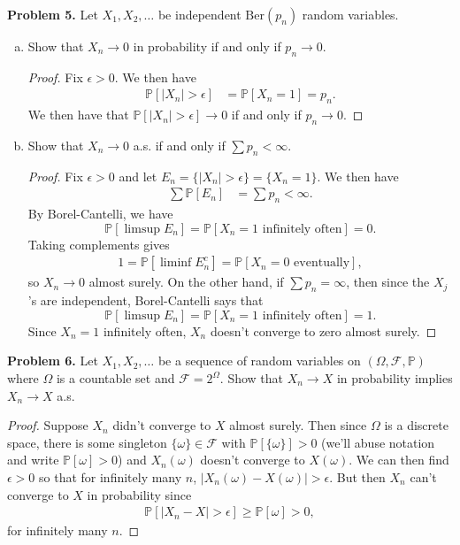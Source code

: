 \documentclass[11pt,letterpaper]{report}
\newcommand{\mcal}[1]{\mathcal{#1}}
\newcommand{\Prob}{\mathbb{P}}
\newcommand{\Ber}{\text{Ber}}
\begin{document}
\noindent\textbf{Problem 5. }
Let $X_1, X_2, \ldots$ be independent $\Ber(p_n)$ random variables.
\begin{enumerate}[(a)]
	\item Show that $X_n\to 0$ in probability if and only if $p_n\to 0$.
	\begin{proof}
		Fix $\epsilon > 0$. We then have
		\begin{align*}
			\Prob[|X_n| > \epsilon] &= \Prob[X_n = 1]
			= p_n.
		\end{align*}
		We then have that $\Prob[|X_n|>\epsilon]\to 0$ if and only if $p_n\to 0$.
	\end{proof}

	\item Show that $X_n\to 0$ a.s. if and only if $\sum p_n <\infty$.
	\begin{proof}
		Fix $\epsilon > 0$ and let $E_n = \{|X_n| > \epsilon\} = \{X_n = 1\}$. We then have
		\begin{align*}
			\sum \Prob[E_n] & = \sum p_n < \infty.
		\end{align*}
		By Borel-Cantelli, we have
		\[
		\Prob[\limsup E_n] = \Prob[ X_n = 1 \text{ infinitely often}] = 0.
		\]
		Taking complements gives
		\begin{align*}
			1 = \Prob[\liminf E_n^c]  = \Prob[X_n = 0 \text{ eventually}],
		\end{align*}
		so $X_n\to 0$ almost surely. On the other hand, if $\sum p_n = \infty$, then since the $X_j$'s are independent, Borel-Cantelli says that 
		\[
		\Prob[\limsup E_n] = \Prob[X_n = 1\text{ infinitely often}] = 1.
		\]
		Since $X_n = 1$ infinitely often, $X_n$ doesn't converge to zero almost surely.
	\end{proof}
\end{enumerate}

\noindent\textbf{Problem 6. }
Let $X_1, X_2, \ldots$ be a sequence of random variables on $(\Omega, \mcal{F}, \Prob)$ where $\Omega$ is a countable set and $\mcal{F} = 2^\Omega$. Show that $X_n\to X$ in probability implies $X_n\to X$ a.s.
\begin{proof}
	Suppose $X_n$ didn't converge to $X$ almost surely. Then since $\Omega$ is a discrete space, there is some singleton $\{\omega\} \in \mcal{F}$ with $\Prob[\{\omega\}] > 0$ (we'll abuse notation and write $\Prob[\omega]>0$) and $X_n(\omega)$ doesn't converge to $X(\omega)$. We can then find $\epsilon>0$ so that for infinitely many $n$, $|X_n(\omega)-X(\omega)| > \epsilon$. But then $X_n$ can't converge to $X$ in probability since
	\begin{align*}
		\Prob[|X_n - X|>\epsilon] \geq \Prob[\omega] > 0,
	\end{align*}
	for infinitely many $n$.
\end{proof}
\end{document}
